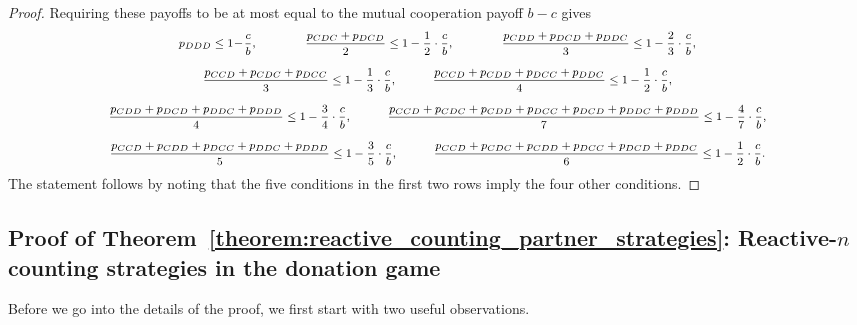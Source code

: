 \documentclass[9pt,twoside,lineno]{pnas-new}
\theoremstyle{plainCl1}
\theoremstyle{plainCl2}
\begin{document}
\begin{proof}
\noindent
Requiring these payoffs to be at most  equal to the mutual cooperation payoff $b\!-\!c$
gives
\begin{equation*} \footnotesize
\begin{array}{c}
\displaystyle  p_{DDD} \leq 1 \!- \!\frac{c}{b}, 
  \qquad \qquad \frac{p_{CDC} + p_{DCD}}{2} \leq 1 - \frac{1}{2} \cdot \frac{c}{b}, 
  \qquad \qquad \frac{p_{CDD} + p_{DCD} + p_{DDC}}{3} \leq 1 - \frac{2}{3} \cdot \frac{c}{b},\\[0.45cm]
\displaystyle  \frac{p_{CCD} + p_{CDC} + p_{DCC}}{3} \leq 1 - \frac{1}{3} \cdot \frac{c}{b},
  \quad \qquad \frac{p_{CCD} + p_{CDD} + p_{DCC} + p_{DDC}}{4} \leq 1 - \frac{1}{2}  \cdot \frac{c}{b}, \\[0.45cm]
\displaystyle  \frac{p_{CDD} + p_{DCD} + p_{DDC} + p_{DDD}}{4} \leq 1 - \frac{3}{4} \cdot \frac{c}{b}, 
  \quad \qquad \frac{p_{CCD} + p_{CDC} + p_{CDD} + p_{DCC} + p_{DCD} + p_{DDC} + p_{DDD}}{7} \leq 1 - \frac{4}{7} \cdot \frac{c}{b}, \\[0.45cm]
\displaystyle  \frac{p_{CCD} + p_{CDD} + p_{DCC} + p_{DDC} + p_{DDD}}{5} \leq 1 - \frac{3}{5} \cdot \frac{c}{b},
  \quad \qquad \frac{p_{CCD} + p_{CDC} + p_{CDD} + p_{DCC} + p_{DCD} + p_{DDC}}{6} \leq 1 - \frac{1}{2} \cdot \frac{c}{b}.
  \end{array}
\end{equation*}
The statement follows by noting that the five conditions in the first two rows imply the four other conditions.
\end{proof}





\subsection{Proof of Theorem~\ref{theorem:reactive_counting_partner_strategies}: Reactive-$n$ counting strategies in the donation game}

Before we go into the details of the proof, we first start with two useful observations.
\end{document}
